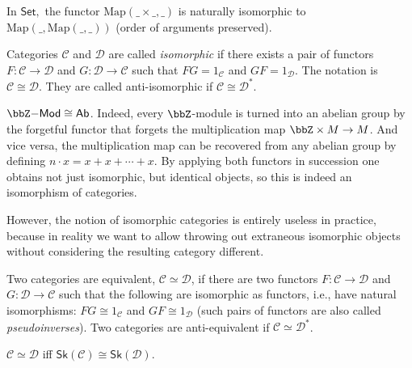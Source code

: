     \begin{example}
    In $\mathsf{Set},$ the functor $\mathrm{Map}\left(\_\times\_,\_\right)$
    is naturally isomorphic to $\mathrm{Map}\left(\_,\mathrm{Map}\left(\_,\_\right)\right)$
    (order of arguments preserved).
\end{example}
\begin{defn}
    Categories $\mathcal{C}$ and $\mathcal{D}$ are called \emph{isomorphic}
    if there exists a pair of functors $F:\mathcal{C}\to\mathcal{D}$
    and $G:\mathcal{D}\to\mathcal{C}$ such that $FG=1_{\mathcal{C}}$
    and $GF=1_{\mathcal{D}}$. The notation is $\mathcal{C}\cong\mathcal{D}$.
    They are called anti-isomorphic if $\mathcal{C}\cong\mathcal{D}^{\ast}$.
\end{defn}

\begin{example}
    $\bbZ\mathsf{-Mod}\cong \mathsf{Ab}$. Indeed, every $\bbZ$-module is turned into an abelian group by the forgetful functor that forgets the multiplication map $\bbZ\times M\to M$. And vice versa, the multiplication map can be recovered from any abelian group by defining $n\cdot x=x+x+\cdots +x$. By applying both functors in succession one obtains not just isomorphic, but identical objects, so this is indeed an isomorphism of categories.
\end{example}

However, the notion of isomorphic categories is entirely useless in
practice, because in reality we want to allow throwing out extraneous
isomorphic objects without considering the resulting category different.
\begin{defn}
 Two categories are equivalent, $\mathcal{C}\simeq\mathcal{D}$,
if there are two functors $F:\mathcal{C}\to\mathcal{D}$ and $G:\mathcal{D}\to\mathcal{C}$
such that the following are isomorphic as functors, i.e., have natural
isomorphisms: $FG\cong1_{\mathcal{C}}$ and $GF\cong1_{\mathcal{D}}$ (such pairs of functors are also called \emph{pseudoinverses}). 
Two categories are anti-equivalent if $\mathcal{C}\simeq\mathcal{D}^{\ast}$.
\end{defn}
%
\begin{prop}
    $\mathcal{C}\simeq\mathcal{D}$ iff $\mathsf{Sk}\left(\mathcal{C}\right)\cong\mathsf{Sk}\left(\mathcal{D}\right)$.
\end{prop}

